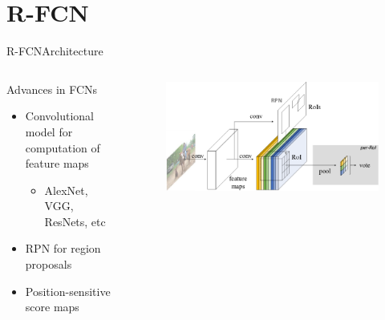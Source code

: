 \section{R-FCN}
\begin{frame}{R-FCN}{Architecture}
\begin{columns}
        \begin{block}{Advances in FCNs}
        \begin{itemize}
            \item Convolutional model for computation of feature maps
            \begin{itemize}
                \item AlexNet, VGG, ResNets, etc
            \end{itemize}
            \item RPN for region proposals
            \item Position-sensitive score maps
        \end{itemize}
    \end{block}
        \begin{figure}
            \includegraphics[width=1.0 \textwidth]{figs/rfcnarchi.png}
        \end{figure}
    \end{columns}
\end{frame}


